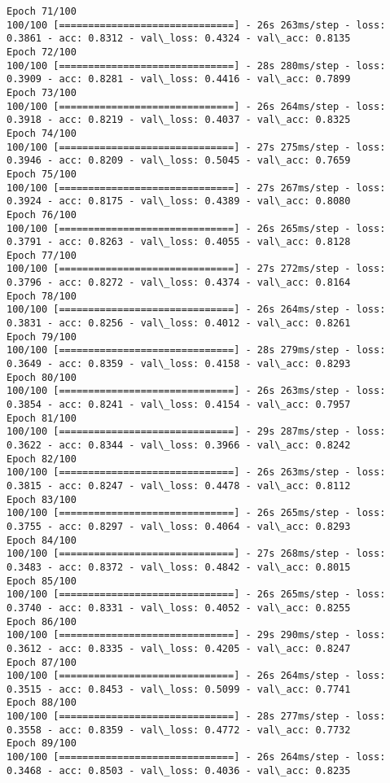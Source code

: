 \documentclass[11pt]{article}
\begin{document}
\begin{Verbatim}[commandchars=\\\{\}]
Epoch 71/100
100/100 [==============================] - 26s 263ms/step - loss: 0.3861 - acc: 0.8312 - val\_loss: 0.4324 - val\_acc: 0.8135
Epoch 72/100
100/100 [==============================] - 28s 280ms/step - loss: 0.3909 - acc: 0.8281 - val\_loss: 0.4416 - val\_acc: 0.7899
Epoch 73/100
100/100 [==============================] - 26s 264ms/step - loss: 0.3918 - acc: 0.8219 - val\_loss: 0.4037 - val\_acc: 0.8325
Epoch 74/100
100/100 [==============================] - 27s 275ms/step - loss: 0.3946 - acc: 0.8209 - val\_loss: 0.5045 - val\_acc: 0.7659
Epoch 75/100
100/100 [==============================] - 27s 267ms/step - loss: 0.3924 - acc: 0.8175 - val\_loss: 0.4389 - val\_acc: 0.8080
Epoch 76/100
100/100 [==============================] - 26s 265ms/step - loss: 0.3791 - acc: 0.8263 - val\_loss: 0.4055 - val\_acc: 0.8128
Epoch 77/100
100/100 [==============================] - 27s 272ms/step - loss: 0.3796 - acc: 0.8272 - val\_loss: 0.4374 - val\_acc: 0.8164
Epoch 78/100
100/100 [==============================] - 26s 264ms/step - loss: 0.3831 - acc: 0.8256 - val\_loss: 0.4012 - val\_acc: 0.8261
Epoch 79/100
100/100 [==============================] - 28s 279ms/step - loss: 0.3649 - acc: 0.8359 - val\_loss: 0.4158 - val\_acc: 0.8293
Epoch 80/100
100/100 [==============================] - 26s 263ms/step - loss: 0.3854 - acc: 0.8241 - val\_loss: 0.4154 - val\_acc: 0.7957
Epoch 81/100
100/100 [==============================] - 29s 287ms/step - loss: 0.3622 - acc: 0.8344 - val\_loss: 0.3966 - val\_acc: 0.8242
Epoch 82/100
100/100 [==============================] - 26s 263ms/step - loss: 0.3815 - acc: 0.8247 - val\_loss: 0.4478 - val\_acc: 0.8112
Epoch 83/100
100/100 [==============================] - 26s 265ms/step - loss: 0.3755 - acc: 0.8297 - val\_loss: 0.4064 - val\_acc: 0.8293
Epoch 84/100
100/100 [==============================] - 27s 268ms/step - loss: 0.3483 - acc: 0.8372 - val\_loss: 0.4842 - val\_acc: 0.8015
Epoch 85/100
100/100 [==============================] - 26s 265ms/step - loss: 0.3740 - acc: 0.8331 - val\_loss: 0.4052 - val\_acc: 0.8255
Epoch 86/100
100/100 [==============================] - 29s 290ms/step - loss: 0.3612 - acc: 0.8335 - val\_loss: 0.4205 - val\_acc: 0.8247
Epoch 87/100
100/100 [==============================] - 26s 264ms/step - loss: 0.3515 - acc: 0.8453 - val\_loss: 0.5099 - val\_acc: 0.7741
Epoch 88/100
100/100 [==============================] - 28s 277ms/step - loss: 0.3558 - acc: 0.8359 - val\_loss: 0.4772 - val\_acc: 0.7732
Epoch 89/100
100/100 [==============================] - 26s 264ms/step - loss: 0.3468 - acc: 0.8503 - val\_loss: 0.4036 - val\_acc: 0.8235

\end{Verbatim}
\end{document}
